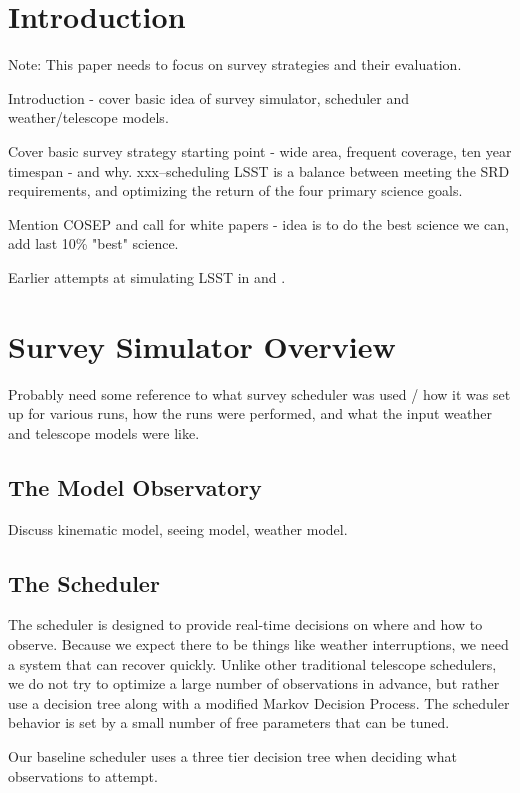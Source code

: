 
\section{Introduction}

Note: This paper needs to focus on survey strategies and their evaluation. 

Introduction - cover basic idea of survey simulator, scheduler and weather/telescope models. 

Cover basic survey strategy starting point - wide area, frequent coverage, ten year timespan - and why. xxx--scheduling LSST is a balance between meeting the SRD requirements, and optimizing the return of the four primary science goals. 

Mention COSEP and call for white papers - idea is to do the best science we can, add last 10\% "best" science. 

Earlier attempts at simulating LSST in \citet{Rothchild19} and \citet{Naghib19}.

\section{Survey Simulator Overview}
Probably need some reference to what survey scheduler was used / how it was set up for various runs, how the runs were performed, and what the input weather and telescope models were like. 

\subsection{The Model Observatory}
Discuss kinematic model, seeing model, weather model. 

\subsection{The Scheduler}

The scheduler is designed to provide real-time decisions on where and how to observe. Because we expect there to be things like weather interruptions, we need a system that can recover quickly. Unlike other traditional telescope schedulers, we do not try to optimize a large number of observations in advance, but rather use a decision tree along with a modified Markov Decision Process. The scheduler behavior is set by a small number of free parameters that can be tuned.

Our baseline scheduler uses a three tier decision tree when deciding what observations to attempt. 

